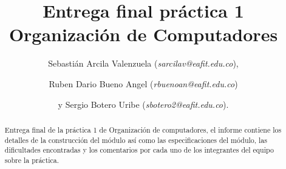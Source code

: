 \documentclass[%
	final,
	notitlepage,
	narroweqnarray,
	inline,
	twoside,
	]{ieee}
\begin{document}
\title[Entrega final práctica 1]{%
       Entrega final práctica 1 \\  Organización de Computadores}

\author[]{Sebastián Arcila Valenzuela (\textit{sarcilav@eafit.edu.co}),
\and{} Ruben Dario Bueno Angel (\textit{rbuenoan@eafit.edu.co})
\and{}y Sergio Botero Uribe (\textit{sbotero2@eafit.edu.co}).
}


\titletext{, \today}


\maketitle               

\begin{abstract} 
Entrega final de la práctica 1 de Organización de computadores, el informe contiene los detalles de la construcción del módulo así como las especificaciones del módulo, las dificultades encontradas y los comentarios por cada uno de los integrantes del equipo sobre la práctica.
\end{abstract}
\end{document}
